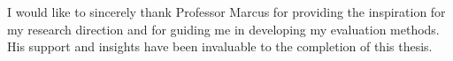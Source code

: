 I would like to sincerely thank Professor Marcus for providing the inspiration for my research direction 
and for guiding me in developing my evaluation methods. 
His support and insights have been invaluable to the completion of this thesis.